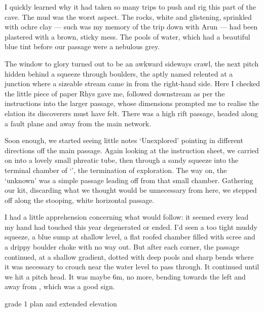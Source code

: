 I quickly learned why it had taken so many trips to push and rig this part of the cave. The mud was the worst aspect. The rocks, white and glistening, sprinkled with ochre clay --- such was my memory of the trip down  with Arun --- had been plastered with a brown, sticky mess. The pools of water, which had a beautiful blue tint before our passage were a nebulous grey.  

The window to glory turned out to be an awkward sideways crawl,  the next pitch hidden behind a squeeze through boulders, the aptly named  relented at a junction where a sizeable stream came in from the right-hand side. Here I checked the little piece of paper Rhys gave me, followed downstream as per the instructions into the larger  passage, whose dimensions prompted me to realise the elation its discoverers must have felt. There was a high rift passage, headed along a fault plane and away from the main  network.


Soon enough, we started seeing little notes `Unexplored' pointing in different directions off the main passage.  Again looking at the instruction sheet, we carried on into a lovely small phreatic tube, then through a sandy squeeze into the terminal chamber of `', the termination of exploration. The way on, the `unknown' was a simple passage leading off from that small chamber. Gathering our kit, discarding what we thought would be unnecessary from here, we stepped off along the stooping, white horizontal passage. 

I had a little apprehension concerning what would follow: it seemed every lead my hand had touched this year degenerated or ended. I'd seen a too tight muddy squeeze, a blue sump at shallow level, a flat roofed chamber filled with scree and a drippy boulder choke with no way out. But after each corner, the passage continued, at a shallow gradient, dotted with deep pools and sharp bends where it was necessary to crouch near the water level to pass through. It continued until we hit a pitch head. It was maybe 6m, no more, bending towards the left and away from , which was a good sign. 

\begin{pagesurvey} \centering
{}
\caption[Alabaster plan and extended elevation (grade 1)]{\protect{} grade 1 plan and extended elevation }
\end{pagesurvey}


